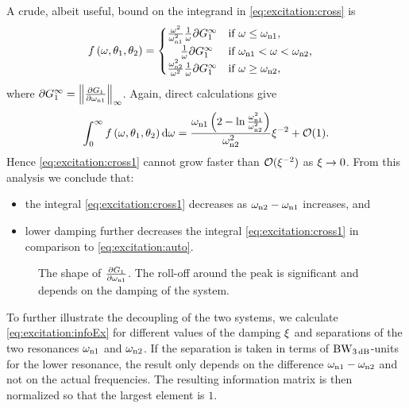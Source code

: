 A crude, albeit useful, bound on the integrand in \eqref{eq:excitation:cross} is
\begin{align}
&f\left(\omega,\theta_1,\theta_2\right)=
  \begin{cases}
   \frac{\omega^2}{\wn[1]^2}
   \frac{1}{\omega}
   \partial G_1^\infty
                                       & \text{if $\omega \leq \wn[1]$,}\\
   \phantom{\frac{\omega^2}{\omega^2}}
   \frac{1}{\omega}
   \partial G_1^\infty
                                       & \text{if $\wn[1] < \omega < \wn[2]$,}\\
   \frac{\wn[2]^2}{\omega^2}
   \frac{1}{\omega}
   \partial G_1^\infty
                                       & \text{if $\omega \geq \wn[2]$,}
  \end{cases}
\end{align}
where $\partial G_1^\infty = \left\|\frac{\partial G_1}{\partial \wn[1]}\right\|_\infty$. 
Again, direct calculations give
\begin{align}
\int_0^\infty f\left(\omega,\theta_1,\theta_2\right)\dd\omega = \frac{\wn[1]\left(2-\ln{\frac{\wn[1]^2}{\wn[2]^2}}\right)}{\wn[2]^2}\damping^{-2} + \mathcal{O}(1).
\end{align}
Hence \eqref{eq:excitation:cross1} cannot grow faster than $\mathcal{O}(\damping^{-2})$ as $\damping\rightarrow0$. From this analysis we conclude that:
\begin{itemize}
\item the integral \eqref{eq:excitation:cross1} decreases as $\wn[2]-\wn[1]$ increases, and
\item lower damping further decreases the integral \eqref{eq:excitation:cross1} in comparison to \eqref{eq:excitation:auto}.
\end{itemize}

\begin{figure}
\centering
\setlength{}
\setlength\figureheight{0.68\figurewidth}

\caption{The shape of $\frac{\partial G_1}{\partial \wn[1]}$. The roll-off around the peak is significant and depends on the damping of the system.}
\label{fig:excitation:dG}
\end{figure}

To further illustrate the decoupling of the two systems, we calculate \eqref{eq:excitation:infoEx} for different values of the damping $\damping$ and separations of the two resonances $\wn[1]$ and $\wn[2]$. If the separation is taken in terms of $\wdB$-units for the lower resonance, the result only depends on the difference $\wn[1]-\wn[2]$ and not on the actual frequencies. The resulting information matrix is then normalized so that the largest element is $1$.

